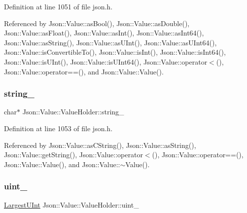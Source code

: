 Definition at line 1051 of file json.\+h.



Referenced by Json\+::\+Value\+::as\+Bool(), Json\+::\+Value\+::as\+Double(), Json\+::\+Value\+::as\+Float(), Json\+::\+Value\+::as\+Int(), Json\+::\+Value\+::as\+Int64(), Json\+::\+Value\+::as\+String(), Json\+::\+Value\+::as\+U\+Int(), Json\+::\+Value\+::as\+U\+Int64(), Json\+::\+Value\+::is\+Convertible\+To(), Json\+::\+Value\+::is\+Int(), Json\+::\+Value\+::is\+Int64(), Json\+::\+Value\+::is\+U\+Int(), Json\+::\+Value\+::is\+U\+Int64(), Json\+::\+Value\+::operator$<$(), Json\+::\+Value\+::operator==(), and Json\+::\+Value\+::\+Value().

\mbox{\label{union_json_1_1_value_1_1_value_holder_a70ac2b153bc405527baa3850d2ddc3cb}} 
\subsubsection{\texorpdfstring{string\+\_\+}{string\_}}
{\footnotesize\ttfamily char$\ast$ Json\+::\+Value\+::\+Value\+Holder\+::string\+\_\+}



Definition at line 1053 of file json.\+h.



Referenced by Json\+::\+Value\+::as\+C\+String(), Json\+::\+Value\+::as\+String(), Json\+::\+Value\+::get\+String(), Json\+::\+Value\+::operator$<$(), Json\+::\+Value\+::operator==(), Json\+::\+Value\+::\+Value(), and Json\+::\+Value\+::$\sim$\+Value().

\mbox{\label{union_json_1_1_value_1_1_value_holder_aab65665dc15a24a29a8e93cdeeaa7e50}} 
\subsubsection{\texorpdfstring{uint\+\_\+}{uint\_}}
{\footnotesize\ttfamily \hyperlink{class_json_1_1_value_a6682a3684d635e03fc06ba229fa24eec}{Largest\+U\+Int} Json\+::\+Value\+::\+Value\+Holder\+::uint\+\_\+}



